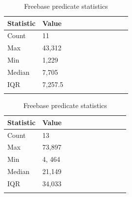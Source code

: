 \begin{table}[H]
	\parbox{.5\linewidth}{
		\centering
		\begin{tabular}{lllllllllll}
  			\textbf{Statistic} & \textbf{Value}  \\
  			\hline
			Count & 11 \\
			Max & 43,312  \\
			Min & 1,229  \\
  			Median & 7,705  \\
  			IQR & 7,257.5  \\
				&
		\end{tabular}
		\captionsetup{justification=centering}
		\caption{WordNet predicate statistics}
		}
	\hfill
	\parbox{.5\linewidth}{
		\centering
		\begin{tabular}{lllllllllll}
  			\textbf{Statistic} & \textbf{Value}  \\
  			\hline
			Count & 13 \\
			Max & 73,897  \\
			Min & 4, 464  \\
  			Median & 21,149  \\
  			IQR & 34,033  \\
				&
		\end{tabular} 
		\captionsetup{justification=centering}
		\caption{Freebase predicate statistics}
		}
\end{table}



